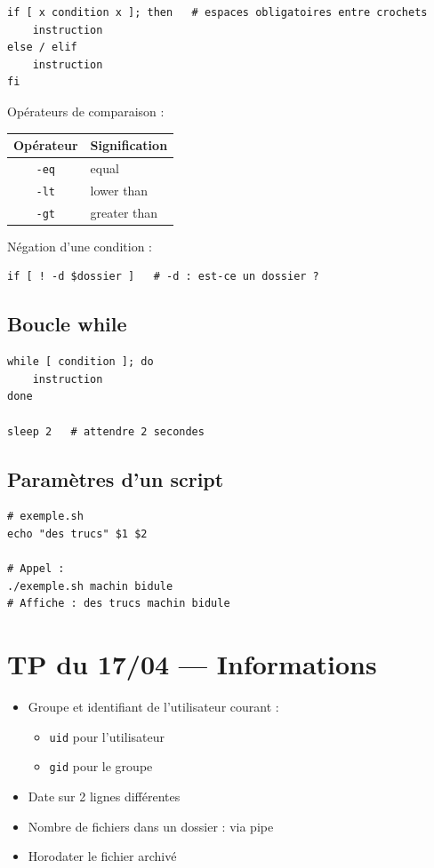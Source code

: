 \documentclass[a4paper,12pt]{article}
\begin{document}
\begin{lstlisting}
if [ x condition x ]; then   # espaces obligatoires entre crochets
    instruction
else / elif
    instruction
fi
\end{lstlisting}

Opérateurs de comparaison :
\begin{center}
\begin{tabular}{|c|l|}
    \hline
    \textbf{Opérateur} & \textbf{Signification} \\
    \hline
    \texttt{-eq} & equal \\
    \texttt{-lt} & lower than \\
    \texttt{-gt} & greater than \\
    \hline
\end{tabular}
\end{center}

Négation d'une condition :
\begin{lstlisting}
if [ ! -d $dossier ]   # -d : est-ce un dossier ?
\end{lstlisting}

\subsection{Boucle while}

\begin{lstlisting}
while [ condition ]; do
    instruction
done

sleep 2   # attendre 2 secondes
\end{lstlisting}

\subsection{Paramètres d'un script}

\begin{lstlisting}
# exemple.sh
echo "des trucs" $1 $2

# Appel :
./exemple.sh machin bidule
# Affiche : des trucs machin bidule
\end{lstlisting}

\section{TP du 17/04 — Informations}

\begin{itemize}
    \item Groupe et identifiant de l'utilisateur courant :
        \begin{itemize}
            \item \texttt{uid} pour l'utilisateur
            \item \texttt{gid} pour le groupe
        \end{itemize}
    \item Date sur 2 lignes différentes
    \item Nombre de fichiers dans un dossier : via pipe
    \item Horodater le fichier archivé
\end{itemize}
\end{document}
